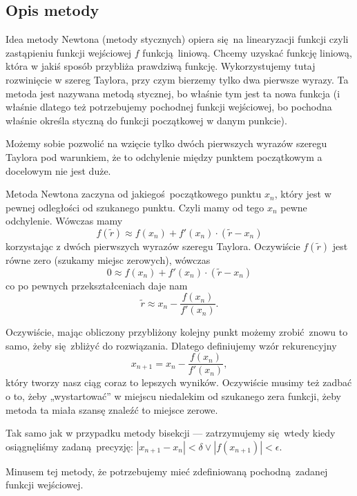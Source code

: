 \documentclass[10pt]{article}
\begin{document}
\subsection{Opis metody}

Idea metody Newtona (metody stycznych) opiera się na linearyzacji funkcji czyli zastąpieniu funkcji wejściowej $f$ funkcją liniową. Chcemy uzyskać funkcję liniową, która w jakiś sposób przybliża prawdziwą funkcję. Wykorzystujemy tutaj rozwinięcie w szereg Taylora, przy czym bierzemy tylko dwa pierwsze wyrazy. Ta metoda jest nazywana metodą stycznej, bo właśnie tym jest ta nowa funkcja (i właśnie dlatego też potrzebujemy pochodnej funkcji wejściowej, bo pochodna właśnie określa styczną do funkcji początkowej w danym punkcie).

Możemy sobie pozwolić na wzięcie tylko dwóch pierwszych wyrazów szeregu Taylora pod warunkiem, że to odchylenie między punktem początkowym a docelowym nie jest duże.

Metoda Newtona zaczyna od jakiegoś początkowego punktu $x_n$, który jest w pewnej odległości od szukanego punktu. Czyli mamy od tego $x_n$ pewne odchylenie. Wówczas mamy
$$
f(\tilde{r}) \approx f(x_n) + f'(x_n) \cdot (\tilde{r} - x_n)
$$
korzystając z dwóch pierwszych wyrazów szeregu Taylora. Oczywiście $f(\tilde{r})$ jest równe zero (szukamy miejsc zerowych), wówczas
$$
0 \approx f(x_n) + f'(x_n) \cdot (\tilde{r} - x_n)
$$
co po pewnych przekształceniach daje nam
$$
\tilde{r} \approx x_n - \frac{f(x_n)}{f'(x_n)}.
$$

Oczywiście, mając obliczony przybliżony kolejny punkt możemy zrobić znowu to samo, żeby się zbliżyć do rozwiązania. Dlatego definiujemy wzór rekurencyjny
\begin{equation}
    x_{n+1} = x_n - \frac{f(x_n)}{f'(x_n)},
    \label{2.recursion}
\end{equation}
który tworzy nasz ciąg coraz to lepszych wyników. Oczywiście musimy też zadbać o to, żeby „wystartować” w miejscu niedalekim od szukanego zera funkcji, żeby metoda ta miała szansę znaleźć to miejsce zerowe.

Tak samo jak w przypadku metody bisekcji — zatrzymujemy się wtedy kiedy osiągnęliśmy zadaną precyzję: $|x_{n+1} - x_n| < \delta \lor |f(x_{n+1})| < \epsilon$.

Minusem tej metody, że potrzebujemy mieć zdefiniowaną pochodną zadanej funkcji wejściowej.
\end{document}
